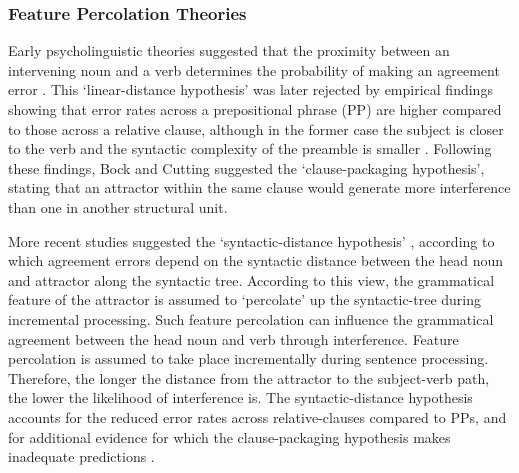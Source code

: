 \subsubsection{Feature Percolation Theories}
Early psycholinguistic theories suggested that the proximity between an intervening noun and a verb determines the probability of making an agreement error \citep{quirk1972grammar}. This `linear-distance hypothesis' was later rejected by empirical findings showing that error rates across a prepositional phrase (PP) are higher compared to those across a relative clause, although in the former case the subject is closer to the verb and the syntactic complexity of the preamble is smaller \citep{bock1992regulating}. Following these findings, Bock and Cutting suggested the `clause-packaging hypothesis', stating that an attractor within the same clause would generate more interference than one in another structural unit. 

More recent studies suggested the `syntactic-distance hypothesis' \citep{vigliocco1995constructing, vigliocco1999sex, franck2002subject}, according to which agreement errors depend on the syntactic distance between the head noun and attractor along the syntactic tree. According to this view, the grammatical feature of the attractor is assumed to `percolate’ up the syntactic-tree during incremental processing. Such feature percolation can influence the grammatical agreement between the head noun and verb through interference. Feature percolation is assumed to take place incrementally during sentence processing. Therefore, the longer the distance from the attractor to the subject-verb path, the lower the likelihood of interference is. The syntactic-distance hypothesis accounts for the reduced error rates across relative-clauses compared to PPs, and for additional evidence for which the clause-packaging hypothesis makes inadequate predictions \citep{franck2002subject}.

